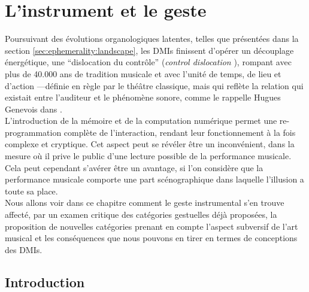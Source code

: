 %
\chapter{L'instrument et le geste}
\label{ch:gesture}





\noindent Poursuivant des évolutions organologiques latentes, telles que présentées dans la section \ref{sec:ephemerality:landscape}, les \glspl{DMI} finissent d'opérer un découplage énergétique, une ``dislocation du contrôle'' (\textit{control dislocation} \cite{miranda_new_2006}), rompant avec plus de 40.000 ans de tradition musicale \cite{conard_new_2009} et avec l'unité de temps, de lieu et d'action —définie en règle par le théâtre classique, mais qui reflète la relation qui existait entre l'auditeur et le phénomène sonore, comme le rappelle Hugues Genevois dans \cite{cance_what_2012}.\\
\indent L'introduction de la mémoire et de la computation numérique permet une re-programmation complète de l'interaction, rendant leur fonctionnement à la fois complexe et cryptique. Cet aspect peut se révéler être un inconvénient, dans la mesure où il prive le public d’une lecture possible de la performance musicale. Cela peut cependant s’avérer être un avantage, si l'on considère que la performance musicale comporte une part scénographique dans laquelle l’illusion a toute sa place.\\
\indent Nous allons voir dans ce chapitre comment le geste instrumental s'en trouve affecté, par un examen critique des catégories gestuelles déjà proposées, la proposition de nouvelles catégories prenant en compte l'aspect subversif de l'art musical et les conséquences que nous pouvons en tirer en termes de conceptions des DMIs.


\section{Introduction}

